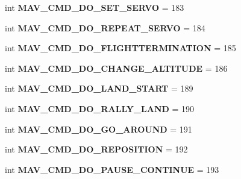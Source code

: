 \begin{DoxyCompactItemize}
int {\bfseries M\+A\+V\+\_\+\+C\+M\+D\+\_\+\+D\+O\+\_\+\+S\+E\+T\+\_\+\+S\+E\+R\+VO} = 183
\item 
\mbox{\label{namespacepymavlink_1_1dialects_1_1v10_adb6ed9070ca6af738648b29825c15ca9}} 
int {\bfseries M\+A\+V\+\_\+\+C\+M\+D\+\_\+\+D\+O\+\_\+\+R\+E\+P\+E\+A\+T\+\_\+\+S\+E\+R\+VO} = 184
\item 
\mbox{\label{namespacepymavlink_1_1dialects_1_1v10_a07c248ab42ca3ec6df82e7dee6e0f3ae}} 
int {\bfseries M\+A\+V\+\_\+\+C\+M\+D\+\_\+\+D\+O\+\_\+\+F\+L\+I\+G\+H\+T\+T\+E\+R\+M\+I\+N\+A\+T\+I\+ON} = 185
\item 
\mbox{\label{namespacepymavlink_1_1dialects_1_1v10_a5261d9785b4bd6449b3416a0ea14169e}} 
int {\bfseries M\+A\+V\+\_\+\+C\+M\+D\+\_\+\+D\+O\+\_\+\+C\+H\+A\+N\+G\+E\+\_\+\+A\+L\+T\+I\+T\+U\+DE} = 186
\item 
\mbox{\label{namespacepymavlink_1_1dialects_1_1v10_a1189a54dfa12c8238bd71597b5f7b291}} 
int {\bfseries M\+A\+V\+\_\+\+C\+M\+D\+\_\+\+D\+O\+\_\+\+L\+A\+N\+D\+\_\+\+S\+T\+A\+RT} = 189
\item 
\mbox{\label{namespacepymavlink_1_1dialects_1_1v10_a43e356ff48f874d23c346720463d4a3b}} 
int {\bfseries M\+A\+V\+\_\+\+C\+M\+D\+\_\+\+D\+O\+\_\+\+R\+A\+L\+L\+Y\+\_\+\+L\+A\+ND} = 190
\item 
\mbox{\label{namespacepymavlink_1_1dialects_1_1v10_a55d81e1e601d46e3d6c99b87340ea35d}} 
int {\bfseries M\+A\+V\+\_\+\+C\+M\+D\+\_\+\+D\+O\+\_\+\+G\+O\+\_\+\+A\+R\+O\+U\+ND} = 191
\item 
\mbox{\label{namespacepymavlink_1_1dialects_1_1v10_aebfea002e95e44867e6adb73f1f7a1b7}} 
int {\bfseries M\+A\+V\+\_\+\+C\+M\+D\+\_\+\+D\+O\+\_\+\+R\+E\+P\+O\+S\+I\+T\+I\+ON} = 192
\item 
\mbox{\label{namespacepymavlink_1_1dialects_1_1v10_af85664805cdc5c1e0c97ba236f2a94e3}} 
int {\bfseries M\+A\+V\+\_\+\+C\+M\+D\+\_\+\+D\+O\+\_\+\+P\+A\+U\+S\+E\+\_\+\+C\+O\+N\+T\+I\+N\+UE} = 193

\end{DoxyCompactItemize}

